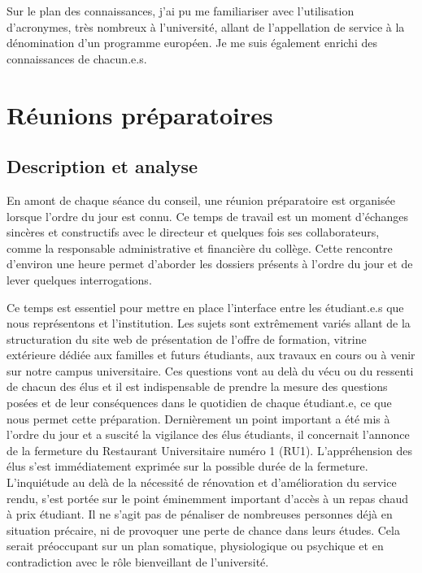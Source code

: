 \documentclass{article}
\begin{document}
Sur le plan des connaissances, j'ai pu me familiariser avec l'utilisation d'acronymes, très nombreux à l'université, allant de l'appellation de service à la dénomination d'un programme européen. Je me suis également enrichi des connaissances de chacun.e.s.

\newpage

\section{Réunions préparatoires} 

\subsection{Description et analyse}
En amont de chaque séance du conseil, une réunion préparatoire est organisée lorsque l'ordre du jour est connu. Ce temps de travail est un moment d'échanges sincères et constructifs avec le directeur et quelques fois ses collaborateurs, comme la responsable administrative et financière du collège. Cette rencontre d'environ une heure permet d'aborder les dossiers présents à l'ordre du jour et de lever quelques interrogations.

Ce temps est essentiel pour mettre en place l'interface entre les étudiant.e.s que nous représentons et l'institution. Les sujets sont extrêmement variés allant de la structuration du site web de présentation de l'offre de formation, vitrine extérieure dédiée aux familles et futurs étudiants, aux travaux en cours ou à venir sur notre campus universitaire. Ces questions vont au delà du vécu ou du ressenti de chacun des élus et il est indispensable de prendre la mesure des questions posées et de leur conséquences dans le quotidien de chaque étudiant.e, ce que nous permet cette préparation. Dernièrement un point important a été mis à l'ordre du jour et a suscité la vigilance des élus étudiants, il concernait l'annonce de la fermeture du Restaurant Universitaire numéro 1 (RU1). L'appréhension des élus s'est immédiatement exprimée sur  la possible durée de la fermeture. L'inquiétude au delà de la nécessité de rénovation et d'amélioration du service rendu, s'est portée sur le point éminemment important d'accès à un repas chaud à prix étudiant. Il ne s'agit pas de pénaliser de nombreuses personnes déjà en situation précaire, ni de provoquer une perte de chance dans leurs études. Cela serait préoccupant sur un plan somatique, physiologique ou psychique et en contradiction avec le rôle bienveillant de l'université.
\end{document}
